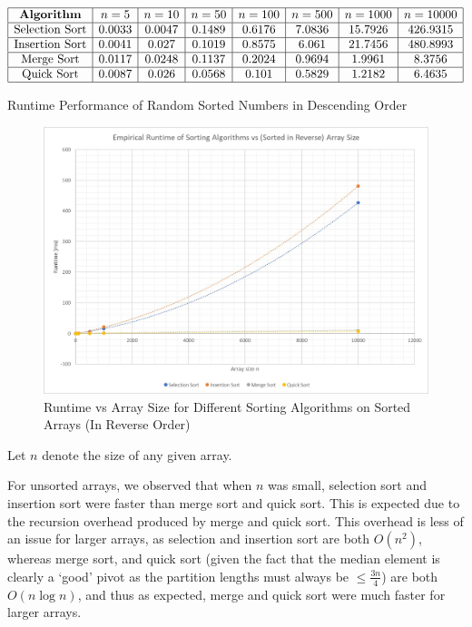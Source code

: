 \documentclass[12pt]{article}
\begin{document}
\begin{center}
\begin{table}[H]
$$\begin{array}{|c|c|c|c|c|c|c|c|}\hline
\textbf{Algorithm} & n=5 & n=10 & n=50 & n=100 & n=500 & n=1000 & n=10000 \\ \hline
\text{Selection Sort} & 0.0033 & 0.0047 & 0.1489 & 0.6176 & 7.0836 & 15.7926 & 426.9315 \\ \hline
\text{Insertion Sort} & 0.0041 & 0.027 & 0.1019 & 0.8575 & 6.061 & 21.7456 & 480.8993 \\ \hline
\text{Merge Sort} & 0.0117 & 0.0248 & 0.1137 & 0.2024 & 0.9694 & 1.9961 & 8.3756 \\ \hline
\text{Quick Sort} & 0.0087 & 0.026 & 0.0568 & 0.101 & 0.5829 & 1.2182 & 6.4635 \\ \hline
\end{array}$$
\caption{Runtime Performance of Random Sorted Numbers in Descending Order}
\label{table:descending}
\end{table}
\end{center}

\begin{center}
\begin{figure}[H]
\hfill\includegraphics[scale=0.8]{reverse.jpg}
\hspace*{\fill}
\caption{Runtime vs Array Size for Different Sorting Algorithms on Sorted Arrays (In Reverse Order)}
\label{fig:reverse}
\end{figure}
\end{center}

Let $n$ denote the size of any given array.

For unsorted arrays, we observed that when $n$ was small, selection sort and insertion sort were faster than merge sort and quick sort. This is expected due to the recursion overhead produced by merge and quick sort. This overhead is less of an issue for larger arrays, as selection and insertion sort are both $O(n^2)$, whereas merge sort, and quick sort (given the fact that the median element is clearly a ‘good’ pivot as the partition lengths must always be $\le\frac{3n}4$) are both $O(n\log{n})$, and thus as expected, merge and quick sort were much faster for larger arrays.
\end{document}
